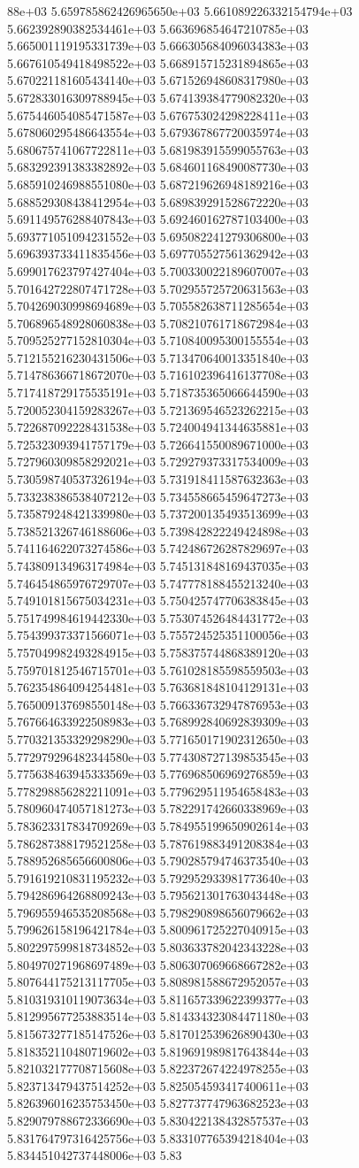 88e+03	5.659785862426965650e+03	5.661089226332154794e+03	5.662392890382534461e+03	5.663696854647210785e+03	5.665001119195331739e+03	5.666305684096034383e+03	5.667610549418498522e+03	5.668915715231894865e+03	5.670221181605434140e+03	5.671526948608317980e+03	5.672833016309788945e+03	5.674139384779082320e+03	5.675446054085471587e+03	5.676753024298228411e+03	5.678060295486643554e+03	5.679367867720035974e+03	5.680675741067722811e+03	5.681983915599055763e+03	5.683292391383382892e+03	5.684601168490087730e+03	5.685910246988551080e+03	5.687219626948189216e+03	5.688529308438412954e+03	5.689839291528672220e+03	5.691149576288407843e+03	5.692460162787103400e+03	5.693771051094231552e+03	5.695082241279306800e+03	5.696393733411835456e+03	5.697705527561362942e+03	5.699017623797427404e+03	5.700330022189607007e+03	5.701642722807471728e+03	5.702955725720631563e+03	5.704269030998694689e+03	5.705582638711285654e+03	5.706896548928060838e+03	5.708210761718672984e+03	5.709525277152810304e+03	5.710840095300155554e+03	5.712155216230431506e+03	5.713470640013351840e+03	5.714786366718672070e+03	5.716102396416137708e+03	5.717418729175535191e+03	5.718735365066644590e+03	5.720052304159283267e+03	5.721369546523262215e+03	5.722687092228431538e+03	5.724004941344635881e+03	5.725323093941757179e+03	5.726641550089671000e+03	5.727960309858292021e+03	5.729279373317534009e+03	5.730598740537326194e+03	5.731918411587632363e+03	5.733238386538407212e+03	5.734558665459647273e+03	5.735879248421339980e+03	5.737200135493513699e+03	5.738521326746188606e+03	5.739842822249424898e+03	5.741164622073274586e+03	5.742486726287829697e+03	5.743809134963174984e+03	5.745131848169437035e+03	5.746454865976729707e+03	5.747778188455213240e+03	5.749101815675034231e+03	5.750425747706383845e+03	5.751749984619442330e+03	5.753074526484431772e+03	5.754399373371566071e+03	5.755724525351100056e+03	5.757049982493284915e+03	5.758375744868389120e+03	5.759701812546715701e+03	5.761028185598559503e+03	5.762354864094254481e+03	5.763681848104129131e+03	5.765009137698550148e+03	5.766336732947876953e+03	5.767664633922508983e+03	5.768992840692839309e+03	5.770321353329298290e+03	5.771650171902312650e+03	5.772979296482344580e+03	5.774308727139853545e+03	5.775638463945333569e+03	5.776968506969276859e+03	5.778298856282211091e+03	5.779629511954658483e+03	5.780960474057181273e+03	5.782291742660338969e+03	5.783623317834709269e+03	5.784955199650902614e+03	5.786287388179521258e+03	5.787619883491208384e+03	5.788952685656600806e+03	5.790285794746373540e+03	5.791619210831195232e+03	5.792952933981773640e+03	5.794286964268809243e+03	5.795621301763043448e+03	5.796955946535208568e+03	5.798290898656079662e+03	5.799626158196421784e+03	5.800961725227040915e+03	5.802297599818734852e+03	5.803633782042343228e+03	5.804970271968697489e+03	5.806307069668667282e+03	5.807644175213117705e+03	5.808981588672952057e+03	5.810319310119073634e+03	5.811657339622399377e+03	5.812995677253883514e+03	5.814334323084471180e+03	5.815673277185147526e+03	5.817012539626890430e+03	5.818352110480719602e+03	5.819691989817643844e+03	5.821032177708715608e+03	5.822372674224978255e+03	5.823713479437514252e+03	5.825054593417400611e+03	5.826396016235753450e+03	5.827737747963682523e+03	5.829079788672336690e+03	5.830422138432857537e+03	5.831764797316425756e+03	5.833107765394218404e+03	5.834451042737448006e+03	5.83